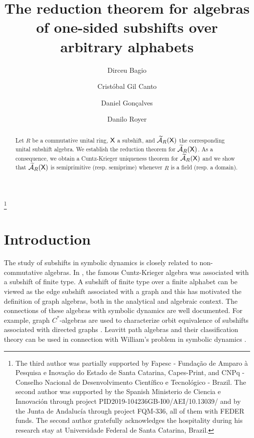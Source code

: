 \documentclass[a4paper,12pt]{amsart}
\title[The reduction theorem for algebras of subshifts]{The reduction theorem for algebras of one-sided subshifts over arbitrary alphabets}
\author[D. Bagio]{Dirceu Bagio}
\author[C. Gil Canto]{Cristóbal Gil Canto}
\author[D. Gonçalves]{Daniel Gonçalves}
\author[D. Royer]{Danilo Royer}
\theoremstyle{definition}
\theoremstyle{remark}
\numberwithin{equation}{section}
\newcommand{\osf}{{\normalfont \textsf{X}}}
\newcommand{\ualgshift}{\TCA_R(\osf)}
\newcommand{\CA}{\mathcal{A}}
\newcommand{\TCA}{\widetilde{\CA}}
\begin{document}

\thanks{The third author was partially supported by Fapesc - Fundação de Amparo à Pesquisa e Inovação do Estado de Santa Catarina, Capes-Print, and CNPq - Conselho Nacional de Desenvolvimento Científico e Tecnológico - Brazil. The second author was supported by the Spanish Ministerio de Ciencia e Innovaci\'on   through project  PID2019-104236GB-I00/AEI/10.13039/ and by the Junta de Andaluc\'{i}a  through project FQM-336,  all of them with FEDER funds. The second author gratefully acknowledges the hospitality during his research stay at Universidade Federal de Santa Catarina, Brazil.}


\begin{abstract} Let $R$ be a commutative unital ring, $\osf$ a subshift, and $\ualgshift$ the corresponding unital subshift algebra. We establish the reduction theorem for $\ualgshift$. As a consequence, we obtain a Cuntz-Krieger uniqueness theorem for $\ualgshift$ and we show that $\ualgshift$ is semiprimitive (resp. semiprime) whenever $R$ is a field (resp. a domain).
\end{abstract}

\maketitle


\section{Introduction}

The study of subshifts in symbolic dynamics is closely related to non-commutative algebras. In \cite{CuntzKrieger}, the famous Cuntz-Krieger algebra was associated with a subshift of finite type. A subshift of finite type over a finite alphabet can be viewed as the edge subshift associated with a graph and this has motivated the definition of graph algebras, both in the analytical and algebraic context. The connections of these algebras with symbolic dynamics are well documented. For example, graph $C^*$-algebras are used to characterize orbit equivalence of subshifts associated with directed graphs \cite{BCW}. Leavitt path algebras \cite{AbrAraMol, GroupoidLeavitt} and their classification theory can be used in connection with William's problem in symbolic dynamics \cite{CGGH, HazratClassificationLPA}. 
\end{document}
